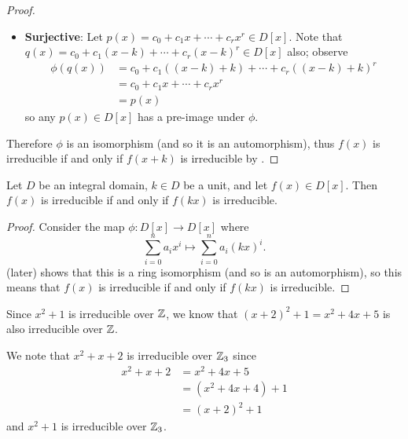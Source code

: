 \begin{proof}
\begin{itemize}
        \item \textbf{Surjective}: Let $p(x) = c_0 + c_1x + \cdots + c_rx^r \in D[x]$. Note that $q(x) = c_0 + c_1(x-k) + \cdots + c_r(x-k)^r \in D[x]$ also; observe
        \begin{align*}
            \phi(q(x)) &= c_0 + c_1((x-k)+k) + \cdots + c_r((x-k)+k)^r\\
            &= c_0 + c_1x + \cdots + c_rx^r\\
            &= p(x)
        \end{align*}
        so any $p(x) \in D[x]$ has a pre-image under $\phi$.
    \end{itemize}
    Therefore $\phi$ is an isomorphism (and so it is an automorphism), thus $f(x)$ is irreducible if and only if $f(x+k)$ is irreducible by .
\end{proof}

\begin{corollary}\label{corollary-irreducible-iff-constant-factor-multiple-is-irreducible}
    Let $D$ be an integral domain, $k \in D$ be a unit, and let $f(x) \in D[x]$. Then $f(x)$ is irreducible if and only if $f(kx)$ is irreducible.
\end{corollary}
\begin{proof}
    Consider the map $\phi: D[x] \to D[x]$ where
    \[
        \sum_{i=0}^n a_ix^i \mapsto \sum_{i=0}^na_i(kx)^i.
    \]
     (later) shows that this is a ring isomorphism (and so is an automorphism), so this means that $f(x)$ is irreducible if and only if $f(kx)$ is irreducible.
\end{proof}

\begin{example}
    Since $x^2 + 1$ is irreducible over $\mathbb{Z}$, we know that $(x+2)^2 + 1 = x^2 + 4x + 5$ is also irreducible over $\mathbb{Z}$.
\end{example}

\begin{example}
    We note that $x^2 + x + 2$ is irreducible over $\mathbb{Z}_3$ since
    \begin{align*}
        x^2 + x + 2 &= x^2 + 4x + 5\\
        &= (x^2 + 4x + 4) + 1\\
        &= (x+2)^2 + 1
    \end{align*}
    and $x^2 + 1$ is irreducible over $\mathbb{Z}_3$.
\end{example}

